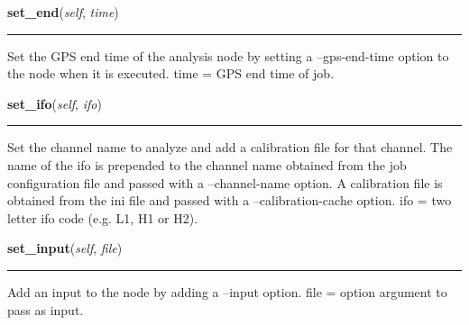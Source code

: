     \noindent\begin{boxedminipage}{\textwidth}

    \raggedright \textbf{set\_end}(\textit{self}, \textit{time})

    \vspace{-1.5ex}

    \rule{\textwidth}{0.5\fboxrule}
    Set the GPS end time of the analysis node by setting a --gps-end-time 
    option to the node when it is executed. time = GPS end time of job.

    \vspace{1ex}

    \end{boxedminipage}

    \label{pipeline:AnalysisNode:set_ifo}
    \vspace{0.5ex}

    \noindent\begin{boxedminipage}{\textwidth}

    \raggedright \textbf{set\_ifo}(\textit{self}, \textit{ifo})

    \vspace{-1.5ex}

    \rule{\textwidth}{0.5\fboxrule}
    Set the channel name to analyze and add a calibration file for that 
    channel. The name of the ifo is prepended to the channel name 
    obtained from the job configuration file and passed with a 
    --channel-name option. A calibration file is obtained from the ini 
    file and passed with a --calibration-cache option. ifo = two letter 
    ifo code (e.g. L1, H1 or H2).

    \vspace{1ex}

    \end{boxedminipage}

    \label{pipeline:AnalysisNode:set_input}
    \vspace{0.5ex}

    \noindent\begin{boxedminipage}{\textwidth}

    \raggedright \textbf{set\_input}(\textit{self}, \textit{file})

    \vspace{-1.5ex}

    \rule{\textwidth}{0.5\fboxrule}
    Add an input to the node by adding a --input option. file = option 
    argument to pass as input.

    \vspace{1ex}

    \end{boxedminipage}

